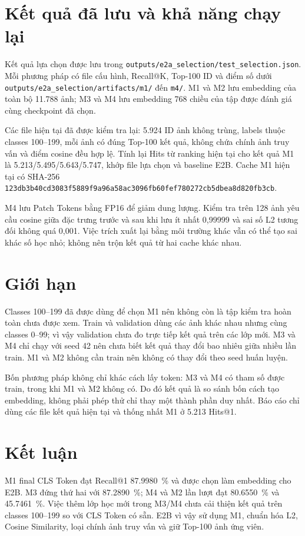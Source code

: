 \documentclass[11pt,a4paper]{article}
\begin{document}
\section{Kết quả đã lưu và khả năng chạy lại}
Kết quả lựa chọn được lưu trong
\texttt{outputs/e2a\_selection/test\_selection.json}. Mỗi phương pháp có file
cấu hình, Recall@K, Top-100 ID và điểm số dưới
\texttt{outputs/e2a\_selection/artifacts/m1/} đến \texttt{m4/}. M1 và M2 lưu
embedding của toàn bộ 11.788 ảnh; M3 và M4 lưu embedding 768 chiều của tập
được đánh giá cùng checkpoint đã chọn.

Các file hiện tại đã được kiểm tra lại: 5.924 ID ảnh không trùng, labels thuộc
classes 100--199, mỗi ảnh có đúng Top-100 kết quả, không chứa chính ảnh truy
vấn và điểm cosine đều hợp lệ. Tính lại Hits từ ranking hiện tại cho kết quả
M1 là 5.213/5.495/5.643/5.747, khớp file lựa chọn và baseline E2B. Cache M1
hiện tại có SHA-256
\texttt{123db3b40cd3083f5889f9a96a58ac3096fb60fef780272cb5dbea8d820fb3cb}.

M4 lưu Patch Tokens bằng FP16 để giảm dung lượng. Kiểm tra trên 128 ảnh yêu
cầu cosine giữa đặc trưng trước và sau khi lưu ít nhất 0,99999 và sai số L2
tương đối không quá 0,001. Việc trích xuất lại bằng môi trường khác vẫn có
thể tạo sai khác số học nhỏ; không nên trộn kết quả từ hai cache khác nhau.

\section{Giới hạn}
Classes 100--199 đã được dùng để chọn M1 nên không còn là tập kiểm tra hoàn
toàn chưa được xem. Train và validation dùng các ảnh khác nhau nhưng cùng
classes 0--99; vì vậy validation chưa đo trực tiếp kết quả trên các lớp mới.
M3 và M4 chỉ chạy với seed 42 nên chưa biết kết quả thay đổi bao nhiêu giữa
nhiều lần train. M1 và M2 không cần train nên không có thay đổi theo seed
huấn luyện.

Bốn phương pháp không chỉ khác cách lấy token: M3 và M4 có tham số được train,
trong khi M1 và M2 không có. Do đó kết quả là so sánh bốn cách tạo embedding,
không phải phép thử chỉ thay một thành phần duy nhất. Báo cáo chỉ dùng các
file kết quả hiện tại và thống nhất M1 ở 5.213 Hits@1.

\section{Kết luận}
M1 final CLS Token đạt Recall@1 \SI{87.9980}{\percent} và được chọn làm
embedding cho E2B. M3 đứng thứ hai với \SI{87.2890}{\percent}; M4 và M2 lần
lượt đạt \SI{80.6550}{\percent} và \SI{45.7461}{\percent}. Việc thêm lớp
học mới trong M3/M4 chưa cải thiện kết quả trên classes 100--199 so với CLS
Token có sẵn. E2B vì vậy sử dụng M1, chuẩn hóa L2, Cosine Similarity, loại
chính ảnh truy vấn và giữ Top-100 ảnh ứng viên.
\end{document}
